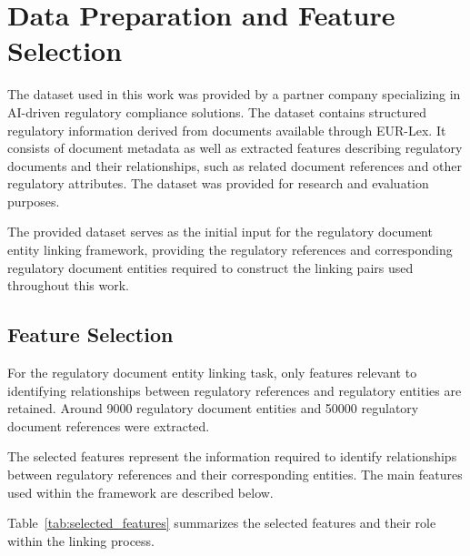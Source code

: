 \section{Data Preparation and Feature Selection}

The dataset used in this work was provided by a partner company specializing in AI-driven regulatory compliance solutions. The dataset contains structured regulatory information derived from documents available through EUR-Lex. It consists of document metadata as well as extracted features describing regulatory documents and their relationships, such as related document references and other regulatory attributes. The dataset was provided for research and evaluation purposes.

The provided dataset serves as the initial input for the regulatory document entity linking framework, providing the regulatory references and corresponding regulatory document entities required to construct the linking pairs used throughout this work.

\subsection{Feature Selection}

For the regulatory document entity linking task, only features relevant to identifying relationships 
between regulatory references and regulatory entities are retained. Around 9000 regulatory document entities and 50000 regulatory document references were extracted.

The selected features represent the information required to identify relationships between regulatory references and their corresponding entities. The main features used within the framework are described below.

Table~\ref{tab:selected_features} summarizes the selected features and their role within 
the linking process.

